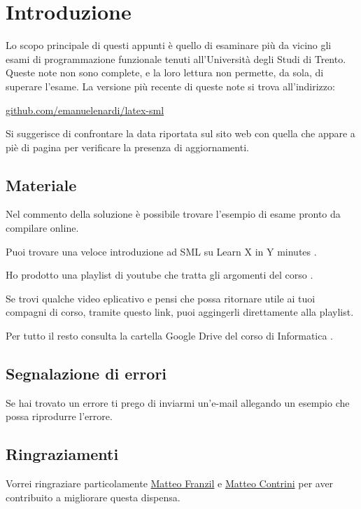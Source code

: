 \section*{Introduzione}

Lo scopo principale di questi appunti è quello di esaminare più da vicino gli esami di programmazione funzionale tenuti all'Università degli Studi di Trento. Queste note non sono complete, e la loro lettura non permette, da sola, di superare l’esame. La versione più recente di queste note si trova all'indirizzo:

\begin{center}
	\url{github.com/emanuelenardi/latex-sml}
\end{center}

Si suggerisce di confrontare la data riportata sul sito web con quella che appare a piè di pagina per verificare la presenza di aggiornamenti.

\subsection*{Materiale}

Nel commento della soluzione è possibile trovare l'esempio di esame pronto da compilare online.

Puoi trovare una veloce introduzione ad SML su Learn X in Y minutes %
\href{https://learnxinyminutes.com/docs/standard-ml/}{\ExternalLink}.

Ho prodotto una playlist di youtube che tratta gli argomenti del corso %
\href{bit.ly/sml-youtube-playlist}{\ExternalLink}.

Se trovi qualche video eplicativo e pensi che possa ritornare utile ai tuoi compagni di corso, tramite questo link, puoi aggingerli direttamente alla playlist.

Per tutto il resto consulta la cartella Google Drive del corso di Informatica %
\href{https://bit.ly/drive-folder}{\ExternalLink}.

\subsection*{Segnalazione di errori}

Se hai trovato un errore ti prego di inviarmi un'e-mail \href{mailto:emanuele.nardi@studenti.unitn.it}{\ExternalLink} allegando un esempio che possa riprodurre l'errore.

\subsection*{Ringraziamenti}

Vorrei ringraziare particolamente \href{https://github.com/mfranzil}{Matteo Franzil} e \href{https://github.com/matteocontrini}{Matteo Contrini} per aver contribuito a migliorare questa dispensa.
